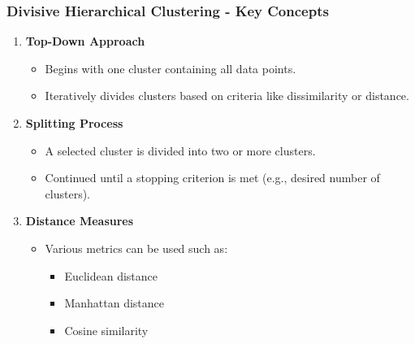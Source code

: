 \documentclass[aspectratio=169]{beamer}
\begin{document}
\begin{frame}[fragile]
    \frametitle{Divisive Hierarchical Clustering - Key Concepts}
    \begin{enumerate}
        \item \textbf{Top-Down Approach}
            \begin{itemize}
                \item Begins with one cluster containing all data points.
                \item Iteratively divides clusters based on criteria like dissimilarity or distance.
            \end{itemize}
        \item \textbf{Splitting Process}
            \begin{itemize}
                \item A selected cluster is divided into two or more clusters.
                \item Continued until a stopping criterion is met (e.g., desired number of clusters).
            \end{itemize}
        \item \textbf{Distance Measures}
            \begin{itemize}
                \item Various metrics can be used such as:
                    \begin{itemize}
                        \item Euclidean distance
                        \item Manhattan distance
                        \item Cosine similarity
                    \end{itemize}
            \end{itemize}
    \end{enumerate}
\end{frame}
\end{document}
